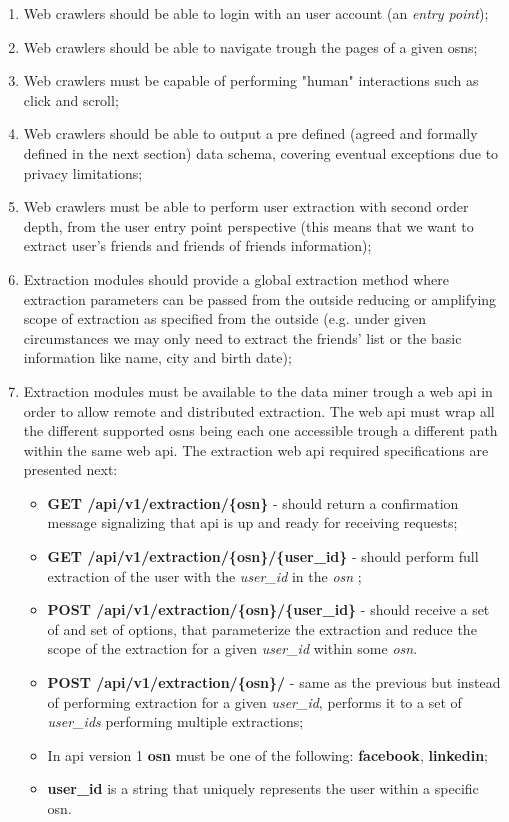 \begin{enumerate}
    \item Web crawlers should be able to login with an user account (an \textit{entry point});
    \item Web crawlers should be able to navigate trough the pages of a given \glspl{osn};
    \item Web crawlers must be capable of performing "human" interactions such as click and scroll;
    \item Web crawlers should be able to output a pre defined (agreed and formally defined in the next section) data schema, covering eventual
    exceptions due to privacy limitations;
    \item Web crawlers must be able to perform user extraction with second order depth, from the user entry point perspective (this means that we want to extract user's friends and friends of friends information);
    \item Extraction modules should provide a global extraction method where extraction parameters can be passed from the outside reducing or amplifying scope of extraction as specified from the outside (e.g. under given circumstances we may only need to extract the friends' list or the basic information like name, city and birth date);
    \item Extraction modules must be available to the data miner trough a web \gls{api} in order to allow remote and distributed extraction. The web \gls{api} must wrap all the different supported \glspl{osn} being each one accessible trough a different path within the same web \gls{api}. The extraction web \gls{api} required specifications are presented next:
    \begin{itemize}
        \item \textbf{GET /api/v1/extraction/\{osn\}} - should return a confirmation message signalizing that \gls{api} is up and ready for receiving requests;
        \item \textbf{GET /api/v1/extraction/\{osn\}/\{user\_id\}} - should perform full extraction of the user with the \textit{user\_id} in the \textit{osn} ;
        \item \textbf{POST /api/v1/extraction/\{osn\}/\{user\_id\}} - should receive a set of and set of options, that parameterize the extraction and reduce the scope of the extraction for a given \textit{user\_id} within some \textit{osn}.
        \item \textbf{POST /api/v1/extraction/\{osn\}/} - same as the previous but instead of performing extraction for a given \textit{user\_id}, performs it to a set of \textit{user\_ids} performing multiple extractions;
        \item In \gls{api} version 1 \textbf{osn} must be one of the following: \textbf{facebook}, \textbf{linkedin};
        \item \textbf{user\_id} is a string that uniquely represents the user within a specific \gls{osn}.
    \end{itemize}
\end{enumerate}

